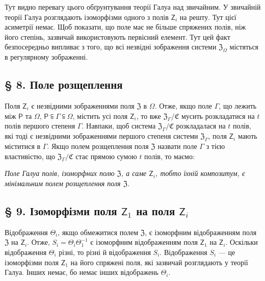 \documentclass[11pt]{article}
\begin{document}
Тут видно перевагу цього обґрунтування теорії Галуа над звичайним. У звичайній теорії Галуа розглядають ізоморфізми одного з полів \(\mathsf{Z}_i\) на решту. Тут цієї асиметрії немає. Щоб показати, що поле має не більше спряжених полів, ніж його степінь, зазвичай використовують первісний елемент. Тут цей факт безпосередньо випливає з того, що всі незвідні зображення системи \(\mathfrak Z_\Omega\) містяться в регулярному зображенні.

\subsection*{§ 8. Поле розщеплення}\label{der-zerfaellungskoerper}

Поля \(\mathsf{Z}_i\) є незвідними зображеннями поля \(\mathfrak Z\) в \(\Omega\). Отже, якщо поле \(\Gamma\), що лежить між \(\mathsf P\) та \(\Omega\), \(\mathsf P\subseteqq\Gamma\subseteqq\Omega\), містить усі поля \(\mathsf{Z}_i\), то вже \(\mathfrak Z_\Gamma/\mathfrak C\) мусить розкладатися на \(t\) полів першого степеня \(\Gamma\). Навпаки, щоб система \(\mathfrak Z_\Gamma/\mathfrak C\) розкладалася на \(t\) полів, які тоді є незвідними зображеннями першого степеня системи \(\mathfrak Z_\Gamma\), поля \(\mathsf{Z}_i\) мають міститися в \(\Gamma\). Якщо полем розщеплення поля \(\mathfrak Z\) назвати поле \(\Gamma\) з тією властивістю, що \(\mathfrak Z_\Gamma/\mathfrak C\) стає прямою сумою \(t\) полів, то маємо:

\emph{Поле Галуа полів, ізоморфних полю \(\mathfrak Z\), а саме \(\mathsf{Z}_i\), тобто їхній композитум, є мінімальним полем розщеплення поля \(\mathfrak Z\).}

\subsection*{§ 9. Ізоморфізми поля \(\mathsf{Z}_1\) на поля \(\mathsf{Z}_i\)}\label{die-isomorphismen-von-z1-auf-die-zi}

Відображення \(\Theta_i\), якщо обмежитися полем \(\mathfrak Z\), є ізоморфним відображенням поля \(\mathfrak Z\) на \(\mathsf{Z}_i\). Отже, \(S_i=\Theta_i\Theta_1^{-1}\) є ізоморфним відображенням поля \(\mathsf{Z}_1\) на \(\mathsf{Z}_i\). Оскільки відображення \(\Theta_i\) різні, то різні й відображення \(S_i\). Відображення \(S_i\) --- це ізоморфізми поля \(\mathsf{Z}_1\) на його спряжені поля, які зазвичай розглядають у теорії Галуа. Інших немає, бо немає інших відображень \(\Theta_i\).
\end{document}
